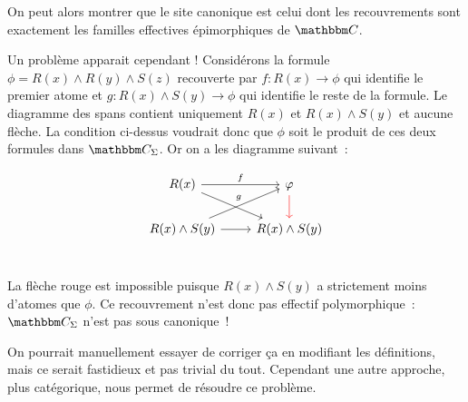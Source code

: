 On peut alors montrer que le site canonique est celui dont les recouvrements sont
exactement les familles effectives épimorphiques de $\C$.

Un problème apparait cependant ! Considérons la formule $\phi=R(x)\wedge R(y)\wedge S(z)$
recouverte par $f:R(x)\rightarrow\phi$ qui identifie le premier atome et
$g:R(x)\wedge S(y)\rightarrow\phi$ qui identifie le reste de la formule. Le diagramme
des spans contient uniquement $R(x)$ et $R(x)\wedge S(y)$ et aucune flèche. La
condition ci-dessus voudrait donc que $\phi$ soit le produit de ces deux formules dans
$\C_\Sigma$. Or on a les diagramme suivant~:

\[\begin{tikzcd}
    R(x) \arrow[r, "f"] \arrow[rd] & \phi \arrow[d, red] \\
    R(x)\wedge S(y) \arrow[ru, "g"] \arrow[r] & R(x)\wedge S(y) \\
\end{tikzcd}\]

La flèche rouge est impossible puisque $R(x)\wedge S(y)$ a strictement moins d'atomes
que $\phi$. Ce recouvrement n'est donc pas effectif polymorphique~: $\C_\Sigma$ n'est pas
sous canonique~!

On pourrait manuellement essayer de corriger ça en modifiant les définitions, mais ce
serait fastidieux et pas trivial du tout. Cependant une autre approche, plus catégorique,
nous permet de résoudre ce problème.

